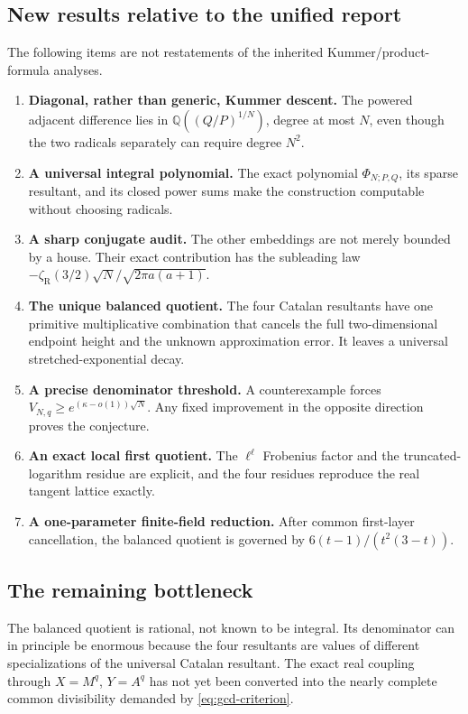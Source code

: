 \documentclass[11pt]{article}
\theoremstyle{definition}
\theoremstyle{remark}
\newcommand{\QQ}{\mathbb Q}
\newcommand{\zR}{\zeta_{\!\mathrm R}}
\begin{document}
\subsection{New results relative to the unified report}
The following items are not restatements of the inherited Kummer/product-formula analyses.
\begin{enumerate}
\item \textbf{Diagonal, rather than generic, Kummer descent.}
The powered adjacent difference lies in \(\QQ((Q/P)^{1/N})\), degree at most \(N\), even though the two radicals separately can require degree \(N^2\).

\item \textbf{A universal integral polynomial.}
The exact polynomial \(\Phi_{N;P,Q}\), its sparse resultant, and its closed power sums make the construction computable without choosing radicals.

\item \textbf{A sharp conjugate audit.}
The other embeddings are not merely bounded by a house.  Their exact contribution has the subleading law
\(-\zR(3/2)\sqrt N/\sqrt{2\pi a(a+1)}\).

\item \textbf{The unique balanced quotient.}
The four Catalan resultants have one primitive multiplicative combination that cancels the full two-dimensional endpoint height and the unknown approximation error.  It leaves a universal stretched-exponential decay.

\item \textbf{A precise denominator threshold.}
A counterexample forces \(V_{N,q}\ge e^{(\kappa-o(1))\sqrt N}\).  Any fixed improvement in the opposite direction proves the conjecture.

\item \textbf{An exact local first quotient.}
The \(\ell^\ell\) Frobenius factor and the truncated-logarithm residue are explicit, and the four residues reproduce the real tangent lattice exactly.

\item \textbf{A one-parameter finite-field reduction.}
After common first-layer cancellation, the balanced quotient is governed by
\(6(t-1)/(t^2(3-t))\).
\end{enumerate}

\subsection{The remaining bottleneck}
The balanced quotient is rational, not known to be integral.  Its denominator can in principle be enormous because the four resultants are values of different specializations of the universal Catalan resultant.  The exact real coupling through \(X=M^q\), \(Y=A^q\) has not yet been converted into the nearly complete common divisibility demanded by \eqref{eq:gcd-criterion}.
\end{document}
